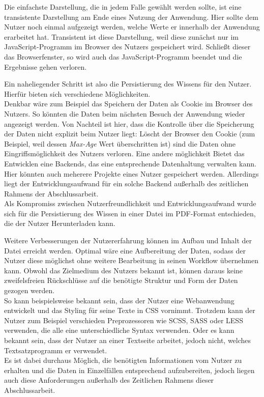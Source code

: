 Die einfachste Darstellung, die in jedem Falle gewählt werden sollte, ist eine transistente Darstellung am Ende eines Nutzung der Anwendung. Hier sollte dem Nutzer noch einmal aufgezeigt werden, welche Werte er innerhalb der Anwendung erarbeitet hat. Transistent ist diese Darstellung, weil diese zunächst nur im JavaScript-Programm im Browser des Nutzers gespeichert wird. Schließt dieser das Browserfenster, so wird auch das JavaScript-Programm beendet und die Ergebnisse gehen verloren.

Ein naheliegender Schritt ist also die Persistierung des Wissens für den Nutzer. Hierfür bieten sich verschiedene Möglichkeiten. \\
Denkbar wäre zum Beispiel das Speichern der Daten als Cookie im Browser des Nutzers. So könnten die Daten beim nächsten Besuch der Anwendung wieder angezeigt werden. Von Nachteil ist hier, dass die Kontrolle über die Speicherung der Daten nicht explizit beim Nutzer liegt: Löscht der Browser den Cookie (zum Beispiel, weil dessen \textit{Max-Age}\footnotemark{} Wert überschritten ist) sind die Daten ohne Eingriffsmöglichkeit des Nutzers verloren.
Eine andere möglichkeit Bietet das Entwicklen eine Backends, das eine entsprechende Datenhaltung verwalten kann. Hier könnten auch meherere Projekte eines Nutzer gespeichert werden. Allerdings liegt der Entwicklungsaufwand für ein solche Backend außerhalb des zeitlichen Rahmens der Abschlussarbeit. \\
Als Kompromiss zwischen Nutzerfreundlichkeit und Entwicklungsaufwand wurde sich für die Persistierung des Wissen in einer Datei im PDF-Format entschieden, die der Nutzer Herunterladen kann.


Weitere Verbesserungen der Nutzererfahrung können im Aufbau und Inhalt der Datei erreicht werden. Optimal wäre eine Aufbereitung der Daten, sodass der Nutzer diese möglichst ohne weitere Bearbeitung in seinen Workflow übernehmen kann. Obwohl das Zielmedium des Nutzers bekannt ist, können daraus keine zweifelsfreien Rückschlüsse auf die benötigte Struktur und Form der Daten gezogen werden. \\
So kann beispielsweise bekannt sein, dass der Nutzer eine Webanwendung entwickelt und das Styling für seine Texte in CSS vornimmt. Trotzdem kann der Nutzer zum Beispiel verschieden Preprozessoren wie SCSS, SASS oder LESS verwenden, die alle eine unterschiedliche Syntax verwenden.
Oder es kann bekannt sein, dass der Nutzer an einer Textseite arbeitet, jedoch nicht, welches Textsatzprogramm er verwendet\footnotemark{}.\\
Es ist dabei durchaus Möglich, die benötigten Informationen vom Nutzer zu erhalten und die Daten in Einzelfällen entsprechend aufzubereiten, jedoch liegen auch diese Anforderungen außerhalb des Zeitlichen Rahmens dieser Abschlussarbeit.
